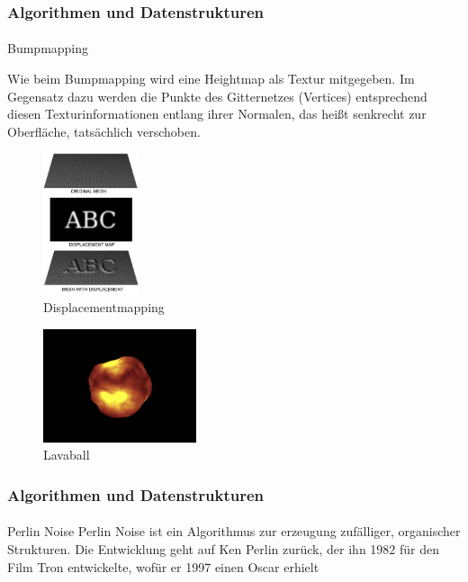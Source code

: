 \documentclass{beamer}
\begin{document}
\begin{frame}
    \frametitle{Algorithmen und Datenstrukturen}
\framesubtitle{}
    \begin{block}{Bumpmapping}


Wie beim Bumpmapping  wird  eine Heightmap als Textur mitgegeben.
Im Gegensatz dazu werden die Punkte des Gitternetzes (Vertices)  entsprechend diesen Texturinformationen entlang ihrer Normalen, 
das heißt senkrecht zur Oberfläche, tatsächlich verschoben. 

\begin{figure}[H]
    \centering
    \includegraphics[width=0.25\textwidth]{images/Displacement.jpg}
    \caption{Displacementmapping} %
    \label{fig:displacement-mapping}
\end{figure}

\begin{figure}[H]
    \centering
    \includegraphics[width=0.4\textwidth]{images/lava.png}
    \caption{Lavaball}
    \label{fig:reflection-phong-specular-model}
\end{figure}
\end{block}

\end{frame}


\begin{frame}
    \frametitle{Algorithmen und Datenstrukturen}
\framesubtitle{}
\begin{block}{Perlin Noise}
Perlin Noise ist ein Algorithmus zur erzeugung zufälliger, 
organischer Strukturen. 
Die Entwicklung geht auf Ken Perlin zurück, 
der ihn 1982 für den Film Tron entwickelte, 
wofür er 1997 einen Oscar erhielt
\end{block}
\end{frame}
\end{document}
